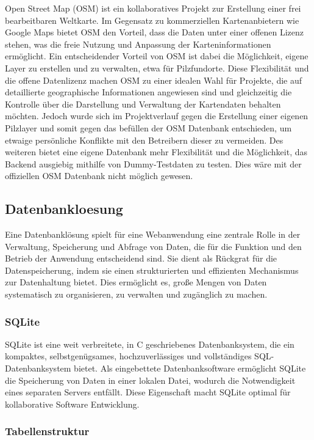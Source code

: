 \documentclass[../main.tex]{subfiles} %
\begin{document}
Open Street Map (OSM) ist ein kollaboratives Projekt zur Erstellung einer frei bearbeitbaren Weltkarte. Im Gegensatz zu kommerziellen
Kartenanbietern wie Google Maps bietet OSM den Vorteil, dass die Daten unter einer offenen Lizenz stehen, was die freie Nutzung und
Anpassung der Karteninformationen ermöglicht. Ein entscheidender Vorteil von OSM ist dabei die Möglichkeit, eigene Layer zu erstellen und
zu verwalten, etwa für Pilzfundorte. Diese Flexibilität und die offene Datenlizenz machen OSM zu einer idealen Wahl für Projekte, die auf
detaillierte geographische Informationen angewiesen sind und gleichzeitig die Kontrolle über die Darstellung und Verwaltung der Kartendaten
behalten möchten. Jedoch wurde sich im Projektverlauf gegen die Erstellung einer eigenen Pilzlayer und somit gegen das befüllen der OSM Datenbank
entschieden, um etwaige persönliche Konflikte mit den Betreibern dieser zu vermeiden. Des weiteren bietet eine eigene Datenbank mehr Flexibilität
und die Möglichkeit, das Backend ausgiebig mithilfe von Dummy-Testdaten zu testen. Dies wäre mit der offiziellen OSM Datenbank nicht möglich gewesen.

\subsection{Datenbankloesung} %

Eine Datenbanklösung spielt für eine Webanwendung eine zentrale Rolle in der Verwaltung, Speicherung und Abfrage von Daten, die für die Funktion und den Betrieb der Anwendung entscheidend sind. 
Sie dient als Rückgrat für die Datenspeicherung, indem sie einen strukturierten und effizienten Mechanismus zur Datenhaltung bietet. 
Dies ermöglicht es, große Mengen von Daten systematisch zu organisieren, zu verwalten und zugänglich zu machen.

\subsubsection{SQLite}

SQLite ist eine weit verbreitete, in C geschriebenes Datenbanksystem, die ein kompaktes, selbstgenügsames, hochzuverlässiges und vollständiges SQL-Datenbanksystem bietet. 
Als eingebettete Datenbanksoftware ermöglicht SQLite die Speicherung von Daten in einer lokalen Datei, wodurch die Notwendigkeit eines separaten Servers entfällt.
Diese Eigenschaft macht SQLite optimal für kollaborative Software Entwicklung.

\subsubsection{Tabellenstruktur}
\end{document}

